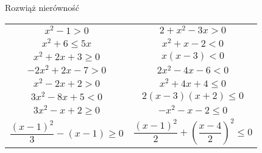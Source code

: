 \documentclass[a4paper,12pt,leqno,fleqn]{article}
\begin{document}
\newpage
Rozwiąż nierówność

\begin{tabularx}{\linewidth}{@{}XX@{}}


  \begin{equation}
    x^2-1>0
  \end{equation}
&
  \begin{equation}
    2+x^2-3x>0
  \end{equation}
\\
  \begin{equation}
    x^2+6\leq5x
  \end{equation}
&
  \begin{equation}
    x^2+x-2<0
  \end{equation}
\\
  \begin{equation}
    x^2+2x+3\geq0
  \end{equation}
&
  \begin{equation}
    x(x-3)<0
  \end{equation}
\\
  \begin{equation}
    -2x^2+2x-7>0
  \end{equation}
&
  \begin{equation}
    2x^2-4x-6<0
  \end{equation}
\\
  \begin{equation}
    x^2-2x+2>0
  \end{equation}
&
  \begin{equation}
    x^2+4x+4\leq0
  \end{equation}
\\
  \begin{equation}
    3x^2-8x+5<0
  \end{equation}
&
  \begin{equation}
    2(x-3)(x+2)\leq0
  \end{equation}
\\
  \begin{equation}
    3x^2-x+2\geq0
  \end{equation}
&
  \begin{equation}
    -x^2-x-2\leq0
  \end{equation}
\\
  \begin{equation}
    \frac{(x-1)^2}{3}-(x-1)\geq0
  \end{equation}
&
  \begin{equation}
    \frac{(x-1)^2}{2}+\left(\frac{x-4}{2}\right)^2\leq0
  \end{equation}

\end{tabularx}
\end{document}

